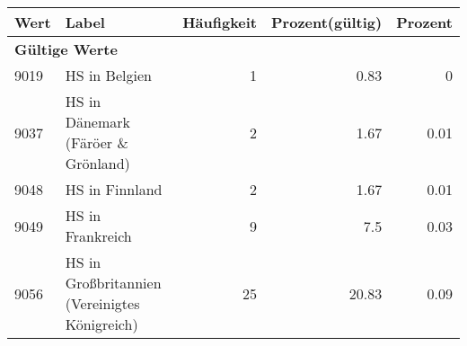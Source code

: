      \begin{longtable}{lXrrr}
     \toprule
     \textbf{Wert} & \textbf{Label} & \textbf{Häufigkeit} & \textbf{Prozent(gültig)} & \textbf{Prozent} \\
     \endhead
     \midrule
     \multicolumn{5}{l}{\textbf{Gültige Werte}}\\

     9019 &
     \multicolumn{1}{X}{ HS in Belgien   } &


       \num{1} &
       \num[round-mode=places,round-precision=2]{0,83} &
         \num[round-mode=places,round-precision=2]{0} \\

     9037 &
     \multicolumn{1}{X}{ HS in Dänemark (Färöer \& Grönland)   } &


       \num{2} &
       \num[round-mode=places,round-precision=2]{1,67} &
         \num[round-mode=places,round-precision=2]{0,01} \\

     9048 &
     \multicolumn{1}{X}{ HS in Finnland   } &


       \num{2} &
       \num[round-mode=places,round-precision=2]{1,67} &
         \num[round-mode=places,round-precision=2]{0,01} \\

     9049 &
     \multicolumn{1}{X}{ HS in Frankreich   } &


       \num{9} &
       \num[round-mode=places,round-precision=2]{7,5} &
         \num[round-mode=places,round-precision=2]{0,03} \\

     9056 &
     \multicolumn{1}{X}{ HS in Großbritannien (Vereinigtes Königreich)   } &


       \num{25} &
       \num[round-mode=places,round-precision=2]{20,83} &
         \num[round-mode=places,round-precision=2]{0,09} \\


\end{longtable}
